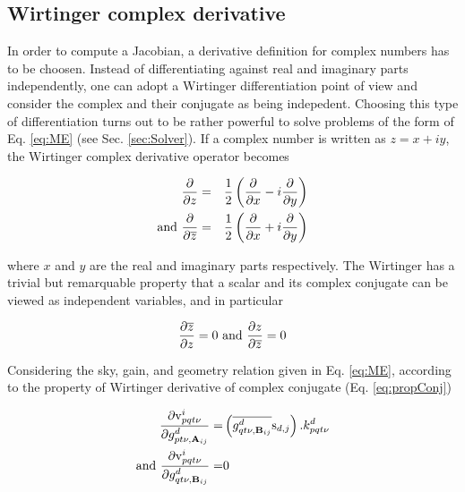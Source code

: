 \subsection{Wirtinger complex derivative}
\label{sec:Cderiv}

In order to compute a Jacobian, a
derivative definition for complex numbers has to be choosen. Instead of
differentiating against real and imaginary parts independently, one can
adopt a Wirtinger differentiation point of view and consider the
complex and their conjugate as being indepedent. Choosing this type of differentiation
turns out to be rather powerful to solve problems of the form of
Eq. \ref{eq:ME} (see
Sec. \ref{sec:Solver}). If a complex number is written as $z=x+iy$, the
Wirtinger complex derivative operator becomes


\begin{alignat}{3}
\frac{\partial }{\partial z}&=&\frac{1}{2}\left(\frac{\partial }{\partial x}-i\frac{\partial }{\partial y}\right)\\
\text{and }\frac{\partial }{\partial \overline{z}}&=&\frac{1}{2}\left(\frac{\partial }{\partial x}+i\frac{\partial }{\partial y}\right)
\end{alignat}

\noindent where $x$ and $y$ are the real and imaginary parts
respectively. The
Wirtinger has a trivial but remarquable property that a scalar and its
complex conjugate can be viewed as independent variables, and in
particular


\begin{equation}
\label{eq:propConj}
\frac{\partial \overline{z}}{\partial z}=0
\text{ and }
\frac{\partial z}{\partial \overline{z}}=0
\end{equation}


Considering the sky, gain, and geometry relation given in
Eq. \ref{eq:ME}, according to the property of Wirtinger derivative of complex
conjugate (Eq. \ref{eq:propConj})

\begin{alignat}{3}
\label{eq:Deriv_gp}
\frac{\partial \mathrm{v}^i_{pqt\nu}}{\partial g^{d}_{pt\nu,\textbf{A}_{ij}}}=&
\left(\conj{g^{d}_{qt\nu,\textbf{B}_{ij}}}\text{s}_{d,j}\right).k^{d}_{pqt\nu}\\
\label{eq:Deriv_gq}
\text{and}\ 
\frac{\partial \mathrm{v}^i_{pqt\nu}}{\partial g^{d}_{qt\nu,\textbf{B}_{ij}}}=&0
\end{alignat}

